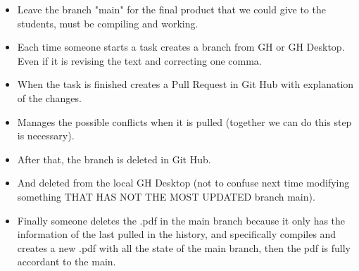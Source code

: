 \begin{itemize}
    \item Leave the branch "main" for the final product that we could give to the students, must be compiling and working.
    \item Each time someone starts a task creates a branch from GH or GH Desktop. Even if it is revising the text and correcting one comma. 
    \item When the task is finished creates a Pull Request in Git Hub with explanation of the changes.
    \item Manages the possible conflicts when it is pulled (together we can do this step is necessary).
    \item After that, the branch is deleted in Git Hub.
    \item And deleted from the local GH Desktop (not to confuse next time modifying something THAT HAS NOT THE MOST UPDATED branch main).
    \item Finally someone deletes the .pdf in the main branch because it only has the information of the last pulled in the history, and specifically compiles and creates a new .pdf with all the state of the main branch, then the pdf is fully accordant to the main.
    
\end{itemize}











